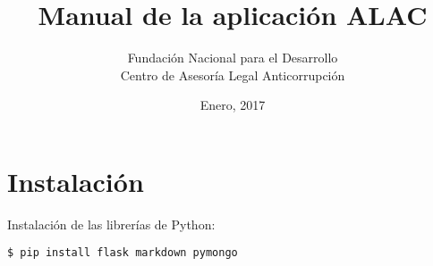 \documentclass{article}
\title{Manual de la aplicación ALAC}
\author{Fundación Nacional para el Desarrollo \\
        Centro de Asesoría Legal Anticorrupción}
\date{Enero, 2017}
\begin{document}
\maketitle

\section{Instalación}

Instalación de las librerías de Python:

\begin{verbatim}
$ pip install flask markdown pymongo
\end{verbatim}
\end{document}
